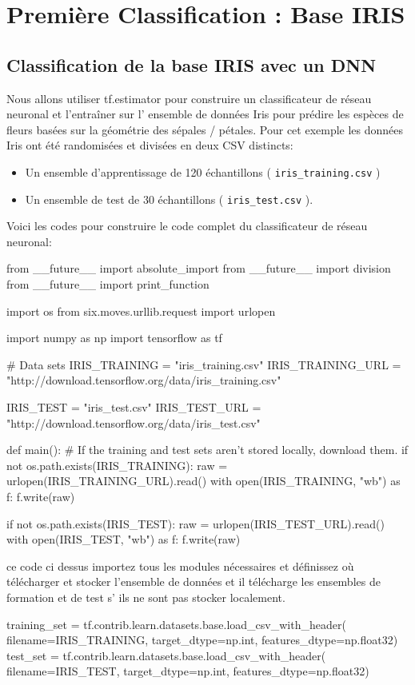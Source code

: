\documentclass[a4paper,11pt]{book}
\theoremstyle{theo}
\begin{document}
\chapter{Première Classification : Base IRIS}
\section{ Classification de la base IRIS avec un DNN }
Nous  allons utiliser  tf.estimator  pour construire un classificateur de réseau neuronal et l'entraîner sur l' ensemble de données Iris pour prédire les espèces de fleurs basées sur la géométrie des sépales / pétales. Pour cet exemple  les données Iris ont été randomisées et divisées en deux CSV distincts:
\begin {itemize}
\item Un ensemble d'apprentissage de 120 échantillons ( \verb+iris_training.csv+ )
\item	Un ensemble de test de 30 échantillons ( \verb+iris_test.csv+ ).
\end{itemize}
 Voici les  codes pour construire le code complet  du classificateur de réseau neuronal:
\begin{mypython}
from __future__ import absolute_import
from __future__ import division
from __future__ import print_function

import os
from six.moves.urllib.request import urlopen

import numpy as np
import tensorflow as tf

# Data sets
IRIS_TRAINING = "iris_training.csv"
IRIS_TRAINING_URL = "http://download.tensorflow.org/data/iris_training.csv"

IRIS_TEST = "iris_test.csv"
IRIS_TEST_URL = "http://download.tensorflow.org/data/iris_test.csv"

def main():
  # If the training and test sets aren't stored locally, download them.
  if not os.path.exists(IRIS_TRAINING):
    raw = urlopen(IRIS_TRAINING_URL).read()
    with open(IRIS_TRAINING, "wb") as f:
      f.write(raw)

  if not os.path.exists(IRIS_TEST):
    raw = urlopen(IRIS_TEST_URL).read()
    with open(IRIS_TEST, "wb") as f:
      f.write(raw)
\end{mypython}
ce code ci dessus importez  tous les modules nécessaires et définissez où télécharger et stocker l'ensemble de données et il télécharge les ensembles de formation et de test  s' ils ne sont pas stocker localement.
\begin{mypython}
training_set = tf.contrib.learn.datasets.base.load_csv_with_header(
      filename=IRIS_TRAINING,
      target_dtype=np.int,
      features_dtype=np.float32)
  test_set = tf.contrib.learn.datasets.base.load_csv_with_header(
      filename=IRIS_TEST,
      target_dtype=np.int,
      features_dtype=np.float32)
\end{mypython}
\end{document}
